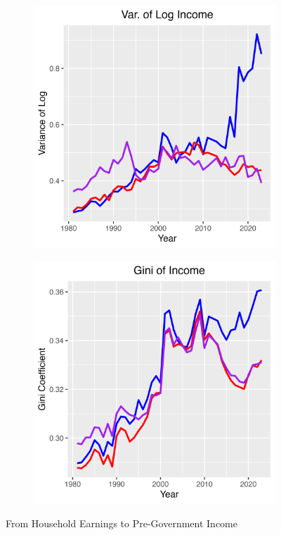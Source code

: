 \documentclass{article}
\begin{document}
\begin{figure}
\begin{subfigure}[t]{0.475\textwidth}
    \end{subfigure}
    \begin{subfigure}[t]{0.475\textwidth}
        \centering
        \includegraphics[width=\textwidth]{figures/Fig_4/Fig_4c_Var_inc.png}
    \end{subfigure}
    \begin{subfigure}[t]{0.475\textwidth}
        \centering
        \includegraphics[width=\textwidth]{figures/Fig_4/Fig_4d_Gini_inc.png}
    \end{subfigure}
    \caption{From Household Earnings to Pre-Government Income}
    \label{fig:Trans_Asset}
\end{figure}
\end{document}
